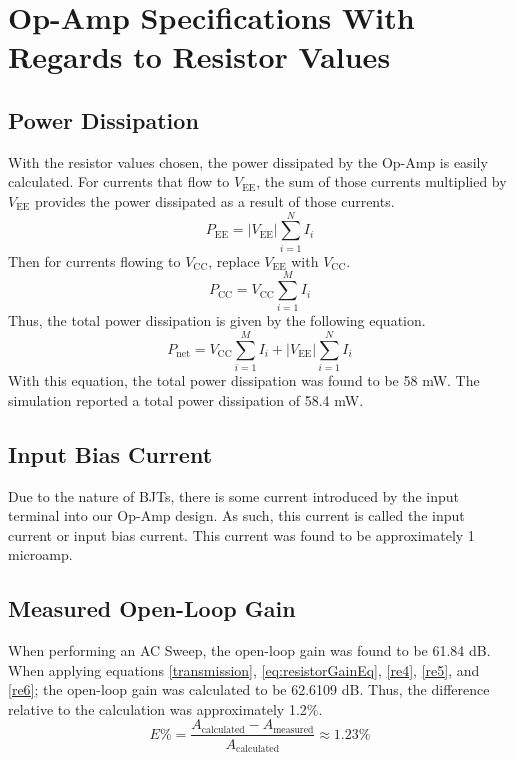 \documentclass[lettersize,journal]{IEEEtran}
\begin{document}
\section{Op-Amp Specifications With Regards to Resistor Values}
\subsection{Power Dissipation}
With the resistor values chosen, the power dissipated by the Op-Amp 
is easily calculated. For currents that flow to $V_{\text{EE}}$, 
the sum of those currents multiplied by $V_{\text{EE}}$ provides 
the power dissipated as a result of those currents.
\begin{equation}
  P_{\text{EE}} = \left|{V_{\text{EE}}}\right| \sum_{i=1}^N I_i
\end{equation}
Then for currents flowing to $V_{\text{CC}}$, replace $V_{\text{EE}}$ with 
$V_{\text{CC}}$.
\begin{equation}
  P_{\text{CC}} = V_{\text{CC}} \sum_{i=1}^M I_i
\end{equation}
Thus, the total power dissipation is given by the following equation.
\begin{equation}
  P_{\text{net}} = V_{\text{CC}} \sum_{i=1}^M I_i + \left|{V_{\text{EE}}}\right| \sum_{i=1}^N I_i
\end{equation}
With this equation, the total power dissipation was found to be 58 mW. The simulation 
reported a total power dissipation of 58.4 mW.

\subsection{Input Bias Current}
Due to the nature of BJTs, there is some current introduced by the input terminal into 
our Op-Amp design. As such, this current is called the input current or 
input bias current. This current was found to be approximately 1 microamp.

\subsection{Measured Open-Loop Gain}
When performing an AC Sweep, the open-loop gain was found to be 61.84 dB. 
When applying equations \eqref{transmission}, \eqref{eq:resistorGainEq}, \eqref{re4}, 
\eqref{re5}, and \eqref{re6}; the open-loop gain was calculated to be 62.6109 dB. 
Thus, the difference relative to the calculation was approximately 1.2\%.
\begin{equation}
  E\% = \frac{A_{\text{calculated}} - A_{\text{measured}}}{A_{\text{calculated}}} \approx 1.23 \% 
\end{equation}
\end{document}
